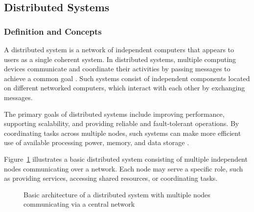 \subsection{Distributed Systems}

\subsubsection{Definition and Concepts}

A distributed system is a network of independent computers that appears to users as a single coherent system. In distributed systems, multiple computing devices communicate and coordinate their activities by passing messages to achieve a common goal \cite{tanenbaum2017}. Such systems consist of independent components located on different networked computers, which interact with each other by exchanging messages.

\vspace{1em}
The primary goals of distributed systems include improving performance, supporting scalability, and providing reliable and fault-tolerant operations. By coordinating tasks across multiple nodes, such systems can make more efficient use of available processing power, memory, and data storage \cite{coulouris2012}.

\vspace{1em}
Figure~\ref{fig:distributed_architecture} illustrates a basic distributed system consisting of multiple independent nodes communicating over a network. Each node may serve a specific role, such as providing services, accessing shared resources, or coordinating tasks.

\begin{figure}[H]
	\centering
	\caption{Basic architecture of a distributed system with multiple nodes communicating via a central network}
	\label{fig:distributed_architecture}
\end{figure}


